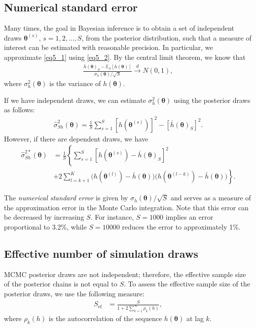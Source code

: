 \subsection{Numerical standard error}
Many times, the goal in Bayesian inference is to obtain a set of independent draws $\bm{\theta}^{(s)}$, $s = 1, 2, \dots, S$, from the posterior distribution, such that a measure of interest can be estimated with reasonable precision. In particular, we approximate \eqref{eq5_1} using \eqref{eq5_2}. By the central limit theorem, we know that
\begin{align}\label{eq_CLT}
	\frac{\bar{h}(\bm{\theta})_S - \mathbb{E}_{\pi}[h(\bm{\theta})]}{\sigma_h(\bm{\theta})/\sqrt{S}} \stackrel{d}{\rightarrow} N(0, 1),
\end{align}
where $\sigma^2_h(\bm{\theta})$ is the variance of $h(\bm{\theta})$.

If we have independent draws, we can estimate $\sigma^2_h(\bm{\theta})$ using the posterior draws as follows: 
\begin{align*}
\hat{\sigma}^2_{Sh}(\bm{\theta}) = \frac{1}{S} \sum_{s=1}^S \left[h(\bm{\theta}^{(s)})\right]^2 - \left[\bar{h}(\bm{\theta})_S\right]^2.
\end{align*}
However, if there are dependent draws, we have
\begin{align*}
\hat{\sigma}^{2*}_{Sh}(\bm{\theta}) &= \frac{1}{S} \left\{\sum_{s=1}^S \left[h(\bm{\theta}^{(s)})-\bar{h}(\bm{\theta})_S\right]^2 \right.\\
&\left.+ 2\sum_{l=k+1}^K \big(h(\bm{\theta}^{(l)}) - \bar{h}(\bm{\theta})\big)\big(h(\bm{\theta}^{(l-k)}) - \bar{h}(\bm{\theta})\big)\right\}.
\end{align*}

The \textit{numerical standard error} is given by $\sigma_h(\bm{\theta})/\sqrt{S}$ and serves as a measure of the approximation error in the Monte Carlo integration. Note that this error can be decreased by increasing $S$. For instance, $S = 1000$ implies an error proportional to 3.2\%, while $S = 10000$ reduces the error to approximately 1\%.
 
\subsection{Effective number of simulation draws}

MCMC posterior draws are not independent; therefore, the effective sample size of the posterior chains is not equal to $S$. To assess the effective sample size of the posterior draws, we use the following measure:
\begin{align*}
	S_{\text{ef}} &= \frac{S}{1 + 2\sum_{k=1}^{\infty} \rho_k(h)},
\end{align*}
where $\rho_k(h)$ is the autocorrelation of the sequence $h(\bm{\theta})$ at lag $k$.

